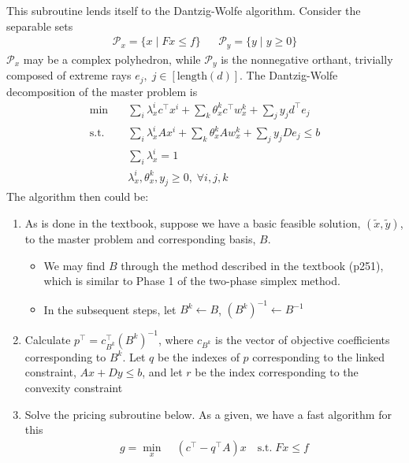 \documentclass[11pt]{exam}
\begin{document}
\begin{questions}
\begin{parts}
      This subroutine lends itself to the Dantzig-Wolfe algorithm. Consider the separable sets 
      \begin{align*}
        \mathcal P_x = \{x \mid Fx \leq f\} && \mathcal P_y = \{y \mid y \geq 0\}
      \end{align*}
      $\mathcal P_x$ may be a complex polyhedron, while $\mathcal P_y$ is the nonnegative orthant, trivially composed of extreme rays $e_j,\; j\in [\text{length}(d)]$. The Dantzig-Wolfe decomposition of the master problem is 
      \begin{align*}
        \min \quad& \sum_i \lambda_x^i c^\top x^i + \sum_k \theta_x^kc^\top w_x^k + \sum_j y_j d^\top e_j\\
        \text{s.t.}\quad& \sum_i \lambda_x^i A x^i + \sum_k \theta_x^kA w_x^k + \sum_j y_j D e_j \leq b \tag{$q$}\\
        & \sum_i \lambda_x^i = 1 \tag{r}\\
        & \lambda_x^i, \theta_x^k, y_j \geq 0,\; \forall i, j, k
      \end{align*}
      The algorithm then could be:
      \begin{enumerate}
        \item As is done in the textbook, suppose we have a basic feasible solution, $(\tilde x, \tilde y)$, to the master problem and corresponding basis, $B$. 
        \begin{itemize}
          \item We may find $B$ through the method described in the textbook (p251), which is similar to Phase 1 of the two-phase simplex method.
          \item In the subsequent steps, let $B^k \leftarrow B$, $(B^k)^{-1} \leftarrow B^{-1}$
        \end{itemize}
        \item Calculate $p^\top = c_{B^k}^\top (B^k)^{-1}$, where $c_{B^k}$ is the vector of objective coefficients corresponding to $B^k$. Let $q$ be the indexes of $p$ corresponding to the linked constraint, $Ax + Dy \leq b$, and let $r$ be the index corresponding to the convexity constraint
        \item Solve the pricing subroutine below. As a given, we have a fast algorithm for this
        \begin{align*}
          g = \min_x\;& (c^\top - q^\top A)x \quad \text{s.t.}\; Fx \leq f \tag*{$h = (c^\top - q^\top A)$}\\
        \end{align*}
        \begin{enumerate}

\end{enumerate}
\end{enumerate}
\end{parts}
\end{questions}
\end{document}
